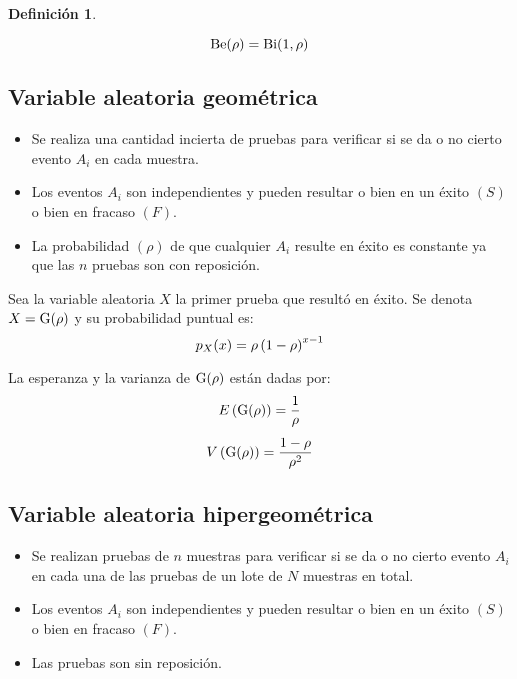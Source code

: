 \documentclass[a5paper,12pt,twoside]{book}
\newtheorem{defn}{{Definición}}[chapter]
\begin{document}
\begin{mdframed}[style=DefinitionFrame]
    \begin{defn}
    \end{defn}
    \begin{equation*}
        \operatorname{Be}(\rho) = \operatorname{Bi}(1,\rho)
    \end{equation*}
\end{mdframed}


\subsection{Variable aleatoria geométrica}

\begin{itemize}
\item Se realiza una cantidad incierta de pruebas para verificar si se da o no cierto evento $A_i$ en cada muestra.

\item Los eventos $A_i$ son independientes y pueden resultar o bien en un éxito $(S)$ o bien en fracaso $(F)$.

\item La probabilidad $(\rho)$ de que cualquier $A_i$ resulte en éxito es constante ya que las $n$ pruebas son con reposición.
\end{itemize}

Sea la variable aleatoria $X$ la primer prueba que resultó en éxito.
Se denota $X=\operatorname{G}(\rho)$ y su probabilidad puntual es:
\begin{equation*}
    p_X(x) = \rho \left(1-\rho\right)^{x-1}
\end{equation*}

La esperanza y la varianza de $\operatorname{G}(\rho)$ están dadas por:
\begin{gather*}
    E \left(\operatorname{G}(\rho)\right) = \frac{1}{\rho}
    \\[1ex]
    V \left(\operatorname{G}(\rho)\right) = \frac{1-\rho}{\rho^2}
\end{gather*}


\subsection{Variable aleatoria hipergeométrica}

\begin{itemize}
\item Se realizan pruebas de $n$ muestras para verificar si se da o no cierto evento $A_i$ en cada una de las pruebas de un lote de $N$ muestras en total.

\item Los eventos $A_i$ son independientes y pueden resultar o bien en un éxito $(S)$ o bien en fracaso $(F)$.

\item Las pruebas son sin reposición.
\end{itemize}
\end{document}
